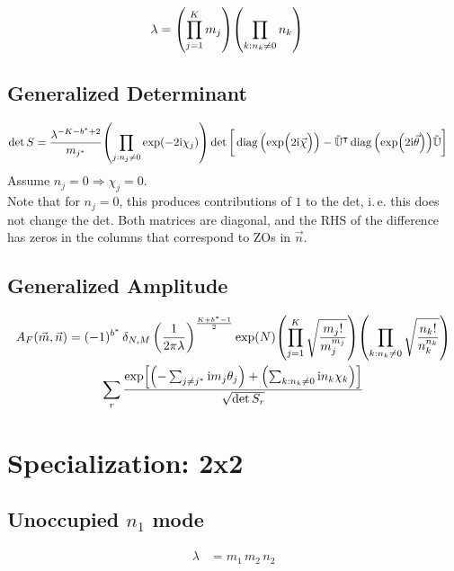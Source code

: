 \documentclass[
	english,
	a4paper,
	fontsize=10pt,
	parskip=half,
	titlepage=true,
	DIV=12,
	final
]{scrreprt}
\newcommand*{\ie}{i.\,e.\xspace}
\newcommand*{\Thus}{\ensuremath{\Rightarrow}\xspace}
\newcommand*{\transp}{\ensuremath{^\intercal}}
\newcommand*{\iunit}{\ensuremath{\mathrm{i}}}
\DeclareMathOperator{\diag}{diag}
\begin{document}
\begin{align}
	\lambda
&=
	\qty( \prod_{j = 1}^{K}      m_j )
	\qty( \prod_{k : n_k \neq 0} n_k )
\label{eqn:DefLambdaNonBZO_n}
\end{align}

\subsection{Generalized Determinant}
\begin{align}
	\det S
&=
	\frac{ \lambda^{-K - b^* + 2} }{ m_{j^*} }
	\qty( \prod_{j: n_j \neq 0} \exp(-2\iunit \chi_j) )
	\det\qty[\bigg.
		\diag\qty(\exp(\Big.2\iunit\vec{\chi}))
		-
		\tilde{\mathbb{U}}\transp
		\diag\qty(\exp(2\iunit\vec{\theta}))
		\tilde{\mathbb{U}}
	]
\label{eqn:detSNonBZO_n}
\end{align}
Assume $n_j = 0 \Thus \chi_j = 0$.\\

Note that for $n_j = 0$, this produces contributions of $1$ to the det, \ie this does not change the det. Both matrices are diagonal, and the RHS of the difference has zeros in the columns that correspond to ZOs in $\vec{n}$.

\subsection{Generalized Amplitude}
\begin{multline}
	A_F(\vec{m}, \vec{n})
=
	(-1)^{b^*} \, \delta_{N,M} \, \qty(
		\frac{1}{2\pi\lambda}
	)^{\frac{K + b^* - 1}{2}}
	\exp(N)
	\qty( \prod_{j = 1}^{K}
		\sqrt{\frac
			{ m_j! }
			{ m_j^{m_j} }
	})
	\qty( \prod_{k : n_k \neq 0}
		\sqrt{\frac
			{ n_k! }
			{ n_k^{n_k} }
	})
\\
	\sum_r
		\frac
		{\exp[
			\qty(- \sum_{j\neq j^*}      \iunit m_j \theta_j) + 
			\qty(  \sum_{k : n_k \neq 0} \iunit n_k \chi  _k)
		]}
		{\sqrt{\det S_r}}
\end{multline}

\section{Specialization: 2x2}
\subsection{Unoccupied $n_1$ mode}
\begin{align}
	\lambda
&=
	m_1 \, m_2 \, n_2
\end{align}
\end{document}

